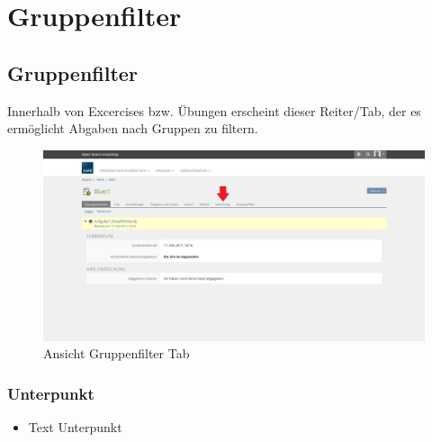\chapter{Gruppenfilter}\label{gruppenfilter}
\minitoc
\clearpage
\section{Gruppenfilter}
Innerhalb von Excercises bzw. Übungen erscheint dieser Reiter/Tab, der es ermöglicht Abgaben nach Gruppen zu filtern. 

\begin{figure}
	\centering
	\includegraphics[width=1\textwidth]{img/excercise.jpg}
	\caption{Ansicht Gruppenfilter Tab}
\end{figure}

\subsection*{Unterpunkt}
\begin{itemize}
	\item Text Unterpunkt
\end{itemize}

\clearpage